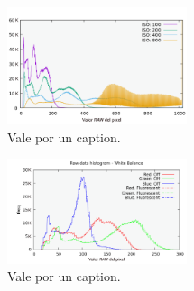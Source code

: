 \documentclass[twoside,twocolumn]{article}
\begin{document}
    \begin{figure}[h]
      \includegraphics[width=0.47\textwidth]{figures/ISO.png}
      \caption{Vale por un caption.
      }
      \label{fig:ISO}
    \end{figure}

    \begin{figure}[h]
      \includegraphics[width=0.47\textwidth]{figures/WB_component_transparent.png}
      \caption{Vale por un caption.
      }
      \label{fig:WB}
    \end{figure}

\end{document}
